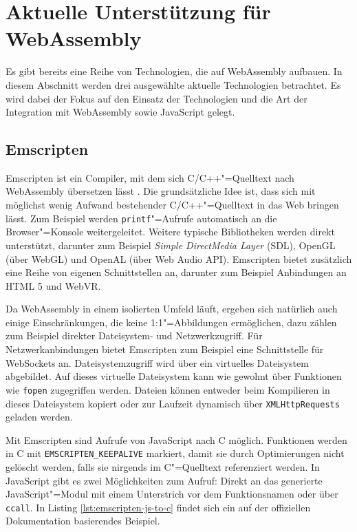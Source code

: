 \pagebreak
\section{Aktuelle Unterstützung für WebAssembly}
Es gibt bereits eine Reihe von Technologien, die auf WebAssembly aufbauen. In diesem Abschnitt werden drei ausgewählte aktuelle Technologien betrachtet. Es wird dabei der Fokus auf den Einsatz der Technologien und die Art der Integration mit WebAssembly sowie JavaScript gelegt.

\subsection{Emscripten}

Emscripten ist ein Compiler, mit dem sich C/C++"=Quelltext nach WebAssembly übersetzen lässt \cite{Emscripten}. Die grundsätzliche Idee ist, dass sich mit möglichst wenig Aufwand bestehender C/C++"=Quelltext in das Web bringen lässt. Zum Beispiel werden \lstinline{printf}"=Aufrufe automatisch an die Browser"=Konsole weitergeleitet. Weitere typische Bibliotheken werden direkt unterstützt, darunter zum Beispiel \emph{Simple DirectMedia Layer} (SDL), OpenGL (über WebGL) und OpenAL (über Web Audio API). Emscripten bietet zusätzlich eine Reihe von eigenen Schnittstellen an, darunter zum Beispiel Anbindungen an HTML 5 und WebVR.

Da WebAssembly in einem isolierten Umfeld läuft, ergeben sich natürlich auch einige Einschränkungen, die keine 1:1"=Abbildungen ermöglichen, dazu zählen zum Beispiel direkter Dateisystem- und Netzwerkzugriff. Für Netzwerkanbindungen bietet Emscripten zum Beispiel eine Schnittstelle für WebSockets an. Dateisystemzugriff wird über ein virtuelles Dateisystem abgebildet. Auf dieses virtuelle Dateisystem kann wie gewohnt über Funktionen wie \lstinline{fopen} zugegriffen werden. Dateien können entweder beim Kompilieren in dieses Dateisystem kopiert oder zur Laufzeit dynamisch über \lstinline{XMLHttpRequests} geladen werden.

Mit Emscripten sind Aufrufe von JavaScript nach C möglich. Funktionen werden in C mit \lstinline{EMSCRIPTEN_KEEPALIVE} markiert, damit sie durch Optimierungen nicht gelöscht werden, falls sie nirgends im C"=Quelltext referenziert werden. In JavaScript gibt es zwei Möglichkeiten zum Aufruf: Direkt an das generierte JavaScript"=Modul mit einem Unterstrich vor dem Funktionsnamen oder über \lstinline{ccall}. In Listing \ref{lst:emscripten-js-to-c} findet sich ein auf der offiziellen Dokumentation basierendes Beispiel.

